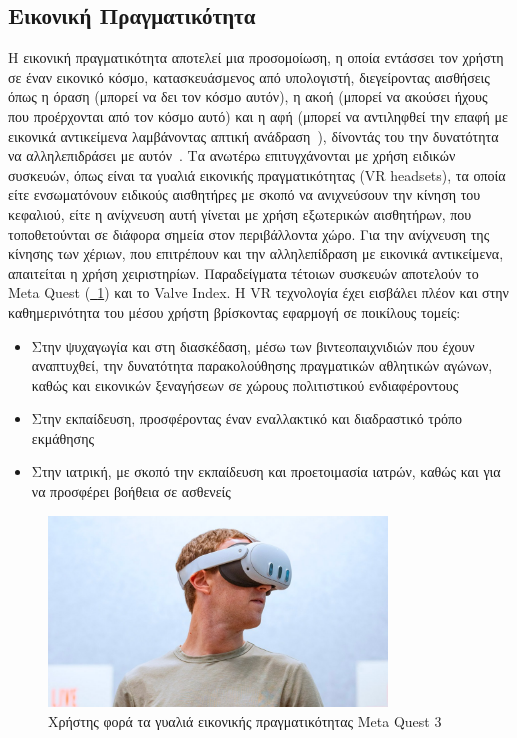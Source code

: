 \subsection{Εικονική Πραγματικότητα}\label{subsec:virtualReality}
Η εικονική πραγματικότητα αποτελεί μια προσομοίωση, η οποία εντάσσει τον χρήστη σε έναν εικονικό κόσμο, κατασκευάσμενος από υπολογιστή, διεγείροντας αισθήσεις όπως η όραση (μπορεί να δει τον κόσμο αυτόν), η ακοή (μπορεί να ακούσει ήχους που προέρχονται από τον κόσμο αυτό) και η αφή (μπορεί να αντιληφθεί την επαφή με εικονικά αντικείμενα λαμβάνοντας απτική ανάδραση~\cite{weiler_2023_phantom}\cite{perret_2018_touching}), δίνοντάς του την δυνατότητα να αλληλεπιδράσει με αυτόν~\cite{lowood_2018_virtual}. Τα ανωτέρω επιτυγχάνονται με χρήση ειδικών συσκευών, όπως είναι τα γυαλιά εικονικής πραγματικότητας (VR headsets), τα οποία είτε ενσωματόνουν ειδικούς αισθητήρες με σκοπό να ανιχνεύσουν την κίνηση του κεφαλιού, είτε η ανίχνευση αυτή γίνεται με χρήση εξωτερικών αισθητήρων, που τοποθετούνται σε διάφορα σημεία στον περιβάλλοντα χώρο. Για την ανίχνευση της κίνησης των χέριων, που επιτρέπουν και την αλληλεπίδραση με εικονικά αντικείμενα, απαιτείται η χρήση χειριστηρίων. Παραδείγματα τέτοιων συσκευών αποτελούν το Meta Quest (\hyperref[fig:meta_quest_3]{\schema~\ref*{fig:meta_quest_3}}) και το Valve Index. Η VR τεχνολογία έχει εισβάλει πλέον και στην καθημερινότητα του μέσου χρήστη βρίσκοντας εφαρμογή σε ποικίλους τομείς:
\begin{itemize}
    \item Στην ψυχαγωγία και στη διασκέδαση, μέσω των βιντεοπαιχνιδιών που έχουν αναπτυχθεί, την δυνατότητα παρακολούθησης πραγματικών αθλητικών αγώνων, καθώς και εικονικών ξεναγήσεων σε χώρους πολιτιστικού ενδιαφέροντους~\cite{loeffler_1993_distributed}\cite{meta_2022_xtadium}\cite{ansari_2021_implementing}
    \item Στην εκπαίδευση, προσφέροντας έναν εναλλακτικό και διαδραστικό τρόπο εκμάθησης~\cite{hamad_2022_how}\cite{kavanagh_2017_a}\cite{freina_2015_a}
    \item Στην ιατρική, με σκοπό την εκπαίδευση και προετοιμασία ιατρών, καθώς και για να προσφέρει βοήθεια σε ασθενείς~\cite{chirico_2015_virtual}\cite{hamad_2022_how}\cite{snoswell_2019_immersive}\cite{gerup_2020_augmented}
\end{itemize}
\begin{figure}[!h]
    \centering
    \includegraphics[width=90mm]{images/meta_quest_3.jpg}
    \caption{Χρήστης φορά τα γυαλιά εικονικής πραγματικότητας Meta Quest 3}\label{fig:meta_quest_3}
\end{figure}

